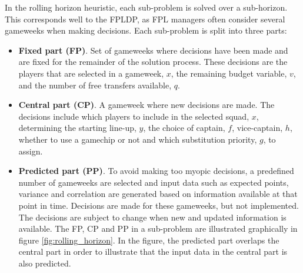 \newpar

In the rolling horizon heuristic, each sub-problem is solved over a sub-horizon. This corresponds well to the FPLDP, as FPL managers often consider several gameweeks when making decisions. Each sub-problem is split into three parts:
\begin{itemize}
    \item \textbf{Fixed part (FP)}. Set of gameweeks where decisions have been made and are fixed for the remainder of the solution process. These decisions are the players that are selected in a gameweek, $x$, the remaining budget variable, $v$, and the number of free transfers available, $q$.
    \item \textbf{Central part (CP)}. A gameweek where new decisions are made. The decisions include which players to include in the selected squad, $x$, determining the starting line-up, $y$, the choice of captain, $f$,  vice-captain, $h$, whether to use a gamechip or not and which substitution priority, $g$, to assign.  
    \item \textbf{Predicted part (PP)}. To avoid making too myopic decisions, a predefined number of gameweeks are selected and input data such as expected points, variance and correlation are generated based on information available at that point in time. Decisions are made for these gameweeks, but not implemented.  The decisions are subject to change when new and updated information is available. The FP, CP and PP in a sub-problem are illustrated graphically in figure \ref{fig:rolling_horizon}. In the figure, the predicted part overlaps the central part in order to illustrate that the input data in the central part is also predicted.
\end{itemize}

